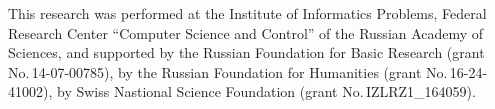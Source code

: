   

\Ack
\noindent
This research was performed at the Institute of Informatics Problems, 
Federal Research Center 
``Computer Science and Control'' of the Russian Academy of Sciences, and 
supported  by the Russian Foundation for Basic Research
(grant No.\,14-07-00785), by the Russian Foundation for Humanities 
(grant No.\,16-24-41002), by Swiss Nastional Science Foundation 
(grant No.\,IZLRZ1\_164059).






  \begin{multicols}{2}

\renewcommand{\bibname}{\protect\rmfamily References}


\end{multicols}
